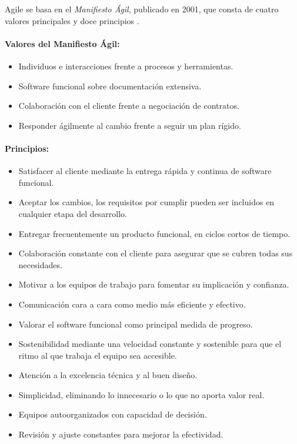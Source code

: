 Agile se basa en el \textit{Manifiesto Ágil}, publicado en 2001, que consta de cuatro valores principales y doce principios \cite{agilemanifest, agilemanifestprinciples}.

\paragraph{Valores del Manifiesto Ágil:}
\begin{itemize}
    \item Individuos e interacciones frente a procesos y herramientas.
    \item Software funcional sobre documentación extensiva.
    \item Colaboración con el cliente frente a negociación de contratos.
    \item Responder ágilmente al cambio frente a seguir un plan rígido.
\end{itemize}

\paragraph{Principios:}
\begin{itemize}
    \item Satisfacer al cliente mediante la entrega rápida y continua de software funcional.
    \item Aceptar los cambios, los requisitos por cumplir pueden ser incluidos en cualquier etapa del desarrollo.
    \item Entregar frecuentemente un producto funcional, en ciclos cortos de tiempo.
    \item Colaboración constante con el cliente para asegurar que se cubren todas sus necesidades.
    \item Motivar a los equipos de trabajo para fomentar su implicación y confianza.
    \item Comunicación cara a cara como medio más eficiente y efectivo.
    \item Valorar el software funcional como principal medida de progreso.
    \item Sostenibilidad mediante una velocidad constante y sostenible para que el ritmo al que trabaja el equipo sea accesible.
    \item Atención a la excelencia técnica y al buen diseño.
    \item Simplicidad, eliminando lo innecesario o lo que no aporta valor real.
    \item Equipos autoorganizados con capacidad de decisión.
    \item Revisión y ajuste constantes para mejorar la efectividad.
\end{itemize}


